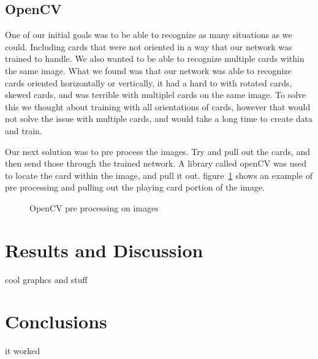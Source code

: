 \documentclass[letterpaper]{article}
\begin{document}
\subsection{OpenCV}
One of our initial goals was to be able to recognize as many situations as we could.  Including cards that were not oriented in a way that our network was trained to handle.  We also wanted to be able to recognize multiple cards within the same image.  What we found was that our network was able to recognize cards oriented horizontally or vertically, it had a hard to with rotated cards, skewed cards, and was terrible with multiplel cards on the same image.  To solve this we thought about training with all orientations of cards, however that would not solve the issue with multiple cards, and would take a long time to create data and train.

Our next solution was to pre process the images.  Try and pull out the cards, and then send those through the trained network.  A library called openCV was used to locate the card within the image, and pull it out.  figure~\ref{fig:opencv_1} shows an example of pre processing and pulling out the playing card portion of the image.

\begin{figure}[!tbp]
  \centering

  \caption{\label{fig:opencv_1} OpenCV pre processing on images}
\end{figure}


\section{Results and Discussion}

cool graphcs and stuff

\section{Conclusions}

it worked

\nocite{*}


\end{document}
